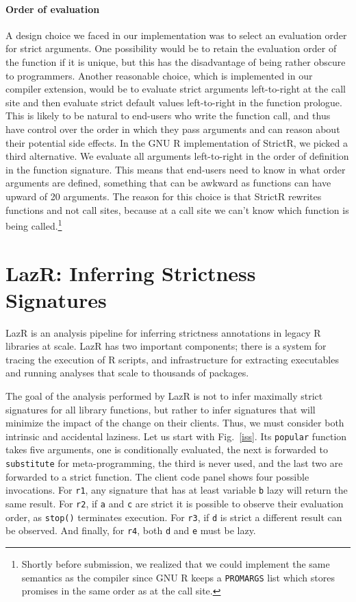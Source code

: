 \documentclass[review,creen,acmsmall]{acmart}
\renewcommand{\c}[1]{\lstinline |#1|\xspace}
\newcommand{\strictr}{{\sf StrictR}\xspace}
\newcommand{\lazr}{{\sf LazR}\xspace}
\begin{document}
\paragraph{Order of evaluation} A design choice we faced in our implementation
was to select an evaluation order for strict arguments. One possibility would be
to retain the evaluation order of the function if it is unique, but this
has the disadvantage of being rather obscure to programmers. Another reasonable
choice, which is implemented in our compiler extension, would be to evaluate
strict arguments left-to-right at the call site and then evaluate strict default
values left-to-right in the function prologue. This is likely to be natural to
end-users who write the function call, and thus have control over the order in
which they pass arguments and can reason about their potential side effects. In
the GNU R implementation of \strictr, we picked a third alternative. We evaluate
all arguments left-to-right in the order of definition in the function
signature. This means that end-users need to know in what order arguments are
defined, something that can be awkward as functions can have upward of 20
arguments. The reason for this choice is that \strictr rewrites functions and
not call sites, because at a call site we can't know which function is being
called.\footnote{Shortly before submission, we realized that we could implement
  the same semantics as the compiler since GNU R keeps a \c{PROMARGS} list which
  stores promises in the same order as at the call site.}

\newpage%
\section{LazR: Inferring Strictness Signatures}\label{sec:lazr}

\lazr is an analysis pipeline for inferring strictness annotations in legacy R
libraries at scale. \lazr has two important components; there is a system for
tracing the execution of R scripts, and infrastructure for extracting
executables and running analyses that scale to thousands of packages.

The goal of the analysis performed by \lazr is not to infer maximally strict
signatures for all library functions, but rather to infer signatures that will
minimize the impact of the change on their clients. Thus, we must consider both
intrinsic and accidental laziness. Let us start with Fig.~\ref{iss}. Its
\c{popular} function takes five arguments, one is conditionally evaluated, the
next is forwarded to \c{substitute} for meta-programming, the third is never
used, and the last two are forwarded to a strict function. The client code panel
shows four possible invocations. For \c{r1}, any signature that has at least
variable \c b lazy will return the same result. For \c{r2}, if \c a and \c c are
strict it is possible to observe their evaluation order, as \c{stop()}
terminates execution. For \c{r3}, if \c{d} is strict a different result can be
observed. And finally, for \c{r4}, both \c d and \c{e} must be lazy.
\end{document}
